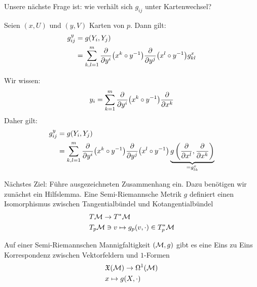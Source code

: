 Unsere nächste Frage ist: wie verhält sich $g_{ij}$ unter Kartenwechsel?
\begin{lem}[Transformationsregel]
\label{lem:Transformationsregel}
Seien $(x, U)$ und $(y, V)$ Karten von $p$.
Dann gilt:
\begin{align*}
g^{y}_{ij} &= g(Y_i, Y_j)\\
&= \sum^m_{k,l = 1} \pdv{y^i}(x^k \circ y^{-1}) \pdv{y^j} (x^l \circ y^{-1}) g^x_{kl}
\end{align*}
\end{lem}
\begin{bew}
Wir wissen:
\begin{align*}
y_i = \sum^m_{k=1} \pdv{y^i} (x^k \circ y^{-1}) \pdv{x^k}
\end{align*}
Daher gilt:
\begin{align*}
g^y_{ij} &= g(Y_i, Y_j)\\
&= \sum^m_{k,l = 1} \pdv{y^i}(x^k \circ y^{-1}) \pdv{y^j} (x^l \circ y^{-1}) \underbrace{g\left( \pdv{x^l}, \pdv{x^k} \right)}_{= g^x_{lk}}
\end{align*}
\end{bew}

Nächstes Ziel: Führe ausgezeichneten Zusammenhang ein.
Dazu benötigen wir zunächst ein Hilfslemma.
Eine Semi-Riemannsche Metrik $g$ definiert einen Isomorphismus zwischen Tangentialbündel und Kotangentialbündel
\begin{align}
&T \mathcal{M} \to T^\ast \mathcal{M}\\
&T_p \mathcal{M} \ni v \mapsto g_p (v, \cdot) \in T^\ast_p \mathcal{M}
\end{align}

\begin{hlem}
\label{hlem:formvfkorrespondenz}
Auf einer Semi-Riemannschen Mannigfaltigkeit $(\mathcal{M}, g)$ gibt es eine Eins zu Eins Korrespondenz zwischen Vektorfeldern und $1$-Formen
\begin{align}
&\mathfrak{X}(\mathcal{M}) \to \Omega^1 (\mathcal{M})\\
& x \mapsto g(X, \cdot)
\end{align}
\end{hlem}

